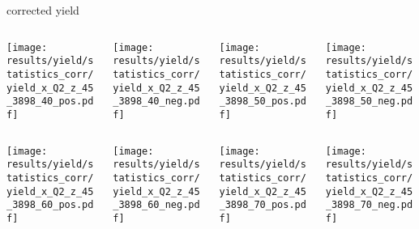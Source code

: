 \begin{frame}{corrected yield}
\begin{columns}
\begin{column}[T]{0.25\textwidth}
\texttt{[image: results/yield/statistics\_corr/yield\_x\_Q2\_z\_45\_3898\_40\_pos.pdf]}
\end{column}
\begin{column}[T]{0.25\textwidth}
\texttt{[image: results/yield/statistics\_corr/yield\_x\_Q2\_z\_45\_3898\_40\_neg.pdf]}
\end{column}
\begin{column}[T]{0.25\textwidth}
\texttt{[image: results/yield/statistics\_corr/yield\_x\_Q2\_z\_45\_3898\_50\_pos.pdf]}
\end{column}
\begin{column}[T]{0.25\textwidth}
\texttt{[image: results/yield/statistics\_corr/yield\_x\_Q2\_z\_45\_3898\_50\_neg.pdf]}
\end{column}
\end{columns}
\begin{columns}
\begin{column}[T]{0.25\textwidth}
\texttt{[image: results/yield/statistics\_corr/yield\_x\_Q2\_z\_45\_3898\_60\_pos.pdf]}
\end{column}
\begin{column}[T]{0.25\textwidth}
\texttt{[image: results/yield/statistics\_corr/yield\_x\_Q2\_z\_45\_3898\_60\_neg.pdf]}
\end{column}
\begin{column}[T]{0.25\textwidth}
\texttt{[image: results/yield/statistics\_corr/yield\_x\_Q2\_z\_45\_3898\_70\_pos.pdf]}
\end{column}
\begin{column}[T]{0.25\textwidth}
\texttt{[image: results/yield/statistics\_corr/yield\_x\_Q2\_z\_45\_3898\_70\_neg.pdf]}
\end{column}
\end{columns}
\end{frame}
